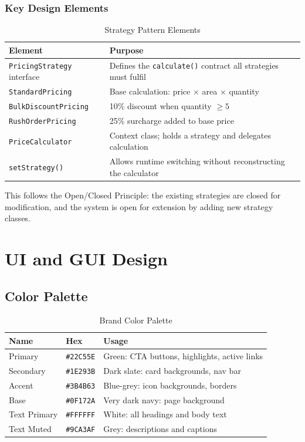 \documentclass[12pt, a4paper]{article}
\begin{document}
\subsubsection{Key Design Elements}

\begin{table}[H]
\centering
\caption{Strategy Pattern Elements}
\begin{tabularx}{\textwidth}{lX}
\toprule
\textbf{Element} & \textbf{Purpose} \\
\midrule
\texttt{PricingStrategy} interface & Defines the \texttt{calculate()} contract all strategies must fulfil \\
\texttt{StandardPricing} & Base calculation: price $\times$ area $\times$ quantity \\
\texttt{BulkDiscountPricing} & 10\% discount when quantity $\geq 5$ \\
\texttt{RushOrderPricing} & 25\% surcharge added to base price \\
\texttt{PriceCalculator} & Context class; holds a strategy and delegates calculation \\
\texttt{setStrategy()} & Allows runtime switching without reconstructing the calculator \\
\bottomrule
\end{tabularx}
\end{table}

This follows the Open/Closed Principle: the existing strategies are closed for modification, and the system is open for extension by adding new strategy classes.

\section{UI and GUI Design}

\subsection{Color Palette}

\begin{table}[H]
\centering
\caption{Brand Color Palette}
\begin{tabularx}{\textwidth}{llX}
\toprule
\textbf{Name} & \textbf{Hex} & \textbf{Usage} \\
\midrule
Primary   & \texttt{\#22C55E} & Green: CTA buttons, highlights, active links \\
Secondary & \texttt{\#1E293B} & Dark slate: card backgrounds, nav bar \\
Accent    & \texttt{\#3B4B63} & Blue-grey: icon backgrounds, borders \\
Base      & \texttt{\#0F172A} & Very dark navy: page background \\
Text Primary & \texttt{\#FFFFFF} & White: all headings and body text \\
Text Muted   & \texttt{\#9CA3AF} & Grey: descriptions and captions \\
\bottomrule
\end{tabularx}
\end{table}
\end{document}
